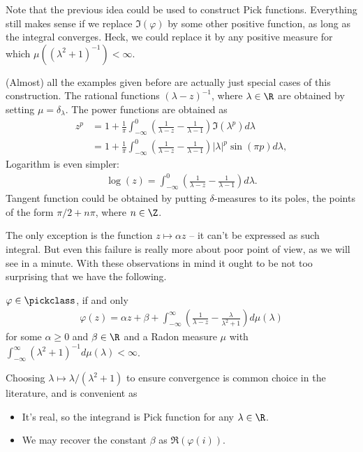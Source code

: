 Note that the previous idea could be used to construct Pick functions. Everything still makes sense if we replace $\Im(\varphi)$ by some other positive function, as long as the integral converges. Heck, we could replace it by any positive measure for which $\mu((\lambda^2 + 1)^{-1}) < \infty$.

(Almost) all the examples given before are actually just special cases of this construction. The rational functions $(\lambda - z)^{-1}$, where $\lambda \in \R$ are obtained by setting $\mu = \delta_{\lambda}$. The power functions are obtained as
\begin{align*}
	z^{p} &= 1 + \frac{1}{\pi}\int_{-\infty}^{0} \left(\frac{1}{\lambda - z} - \frac{1}{\lambda - 1}\right) \Im(\lambda^{p}) d \lambda \\
	&=1 + \frac{1}{\pi}\int_{-\infty}^{0} \left(\frac{1}{\lambda - z} - \frac{1}{\lambda - 1}\right) |\lambda|^{p} \sin(\pi p) d \lambda,
\end{align*}
Logarithm is even simpler:
\begin{align*}
	\log(z) = \int_{-\infty}^{0} \left(\frac{1}{\lambda - z} - \frac{1}{\lambda - 1}\right) d \lambda.
\end{align*}
Tangent function could be obtained by putting $\delta$-measures to its poles, the points of the form $\pi/2 + n \pi$, where $n \in \Z$.

The only exception is the function $z \mapsto \alpha z$ -- it can't be expressed as such integral. But even this failure is really more about poor point of view, as we will see in a minute. With these observations in mind it ought to be not too surprising that we have the following.

\begin{lause}\label{pick_nevanlinna_herglotz_representation_theorem}
	$\varphi \in \pickclass$, if and only
	\begin{align}\label{pick_representation}
		\varphi(z) = \alpha z + \beta + \int_{-\infty}^{\infty} \left(\frac{1}{\lambda - z} - \frac{\lambda}{\lambda^2 + 1}\right) d \mu(\lambda)
	\end{align}
	for some $\alpha \geq 0$ and $\beta \in \R$ and a Radon measure $\mu$ with $\int_{-\infty}^{\infty} (\lambda^2 + 1)^{-1} d \mu(\lambda) < \infty$.
\end{lause}

Choosing $\lambda \mapsto \lambda/(\lambda^2 + 1)$ to ensure convergence is common choice in the literature, and is convenient as
\begin{itemize}
	\item It's real, so the integrand is Pick function for any $\lambda \in \R$.
	\item We may recover the constant $\beta$ as $\Re(\varphi(i))$.
\end{itemize}

